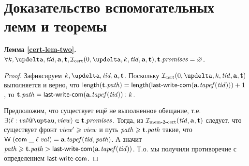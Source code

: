 \section{Доказательство вспомогательных лемм и теоремы}

\noindent
{\bf Лемма \ref{cert-lem-two}.}
$\forall k, \delta, \tId, \aT, \tT, \invCert(0, \delta, k, \tId, \aT, \tT), \tT.\PromSet = \emptyset$.
\begin{proof}%
  Зафиксируем $k, \delta, \tId, \aT, \tT$.
  Поскольку $\invCert(0, \delta, k, \tId, \aT, \tT)$ выполняется и верно, что 
  $\length(\tT.\cpath) = \length(\lastCommittedWrite(\aT.\tapef(\tId))) + 1$, то
  $\tT.\cpath = \lastCommittedWrite(\aT.\tapef(\tId)):k$.
  
  Предположим, что существует ещё не выполненное обещание,
  т.е. $\exists \writeEvt{\loc}{\stval}{\tau}{\R} \in \tT.\PromSet$.
  Тогда, из $\mathcal{I}_{\textup{\rm mem-2-cert}}(\mathit{tid}, \mathbf{a}, \mathbf{t})$ следует, что
  существует фронт $\mathit{view}' \geqslant \mathit{view}$ и путь $\mathit{path} \geqslant \mathbf{t}.\mathit{path}$ такие, что
  $\textsf{W} \; (\mathsf{com} \; \_ \; \ell \; \mathit{val}) = \mathbf{a}.\mathit{tapef}(\mathit{tid}, \mathit{path})$.
  А значит 
  $\mathit{path} \geqslant \mathbf{t}.\mathit{path} > \textup{\sf last-write-com}(\mathbf{a}.\mathit{tapef}(\mathit{tid}))$.
  Т.о. мы получили противоречие с определением $\textup{\sf last-write-com}$.
\end{proof}

